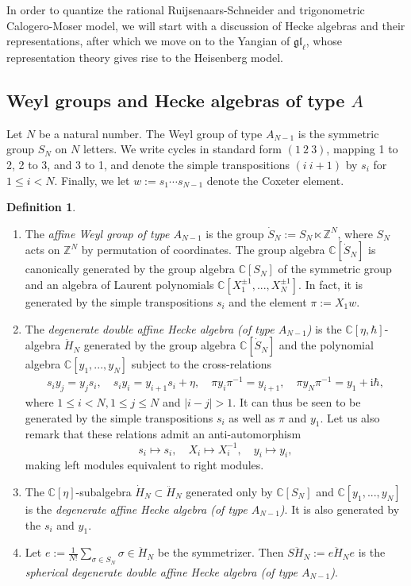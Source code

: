 \documentclass[11pt]{report}
\theoremstyle{definition}
\newtheorem{definition}[theorem]{Definition}
\theoremstyle{remark}
\theoremstyle{remark}
\newcommand{\Z}{\mathbb{Z}}
\newcommand{\C}{\mathbb{C}}
\newcommand{\I}{\mathrm{i}}
\begin{document}
In order to quantize the rational Ruijsenaars-Schneider and trigonometric Calogero-Moser model, we will start with a discussion of Hecke algebras and their representations, after which we move on to the Yangian of $\mathfrak{gl}_\ell$, whose representation theory gives rise to the Heisenberg model.

\subsection{Weyl groups and Hecke algebras of type $A$}

Let $N$ be a natural number. The Weyl group of type $A_{N-1}$ is the symmetric group $S_N$ on $N$ letters. We write cycles in standard form $(1 \ 2 \ 3)$, mapping 1 to 2, 2 to 3, and 3 to 1, and denote the simple transpositions $(i \ i+1)$ by $s_i$ for $1 \leq i < N$. Finally, we let $w := s_1 \cdots s_{N-1}$ denote the Coxeter element.

\begin{definition}
\begin{enumerate}[label=(\roman*)]
\item The \emph{affine Weyl group of type $A_{N-1}$} is the group $\dot S_N := S_N \ltimes \Z^N$, where $S_N$ acts on $\Z^N$ by permutation of coordinates. The group algebra $\C[\dot S_N]$ is canonically generated by the group algebra $\C[S_N]$ of the symmetric group and an algebra of Laurent polynomials $\C[X_1^{\pm 1},...,X_N^{\pm 1}]$. In fact, it is generated by the simple transpositions $s_i$ and the element $\pi := X_1 w$.
\item The \emph{degenerate double affine Hecke algebra (of type $A_{N-1}$)} is the $\C[\eta,\hbar]$-algebra $\ddot H_N$ generated by the group algebra $\C[\dot S_N]$ and the polynomial algebra $\C[y_1,...,y_N]$ subject to the cross-relations
\begin{align*}
s_i y_j = y_j s_i, \quad s_i y_i = y_{i+1} s_i + \eta, \quad \pi y_i \pi^{-1} = y_{i+1}, \quad \pi y_N \pi^{-1} = y_1 + \I \hbar,
\end{align*}
where $1 \leq i < N, 1 \leq j \leq N$ and $|i-j|>1$. It can thus be seen to be generated by the simple transpositions $s_i$ as well as $\pi$ and $y_1$. Let us also remark that these relations admit an anti-automorphism
\begin{equation*}
s_i \mapsto s_i, \quad X_i \mapsto X_i^{-1}, \quad y_i \mapsto y_i,
\end{equation*}
making left modules equivalent to right modules.
\item The $\C[\eta]$-subalgebra $\dot H_N \subset \ddot H_N$ generated only by $\C[S_N]$ and $\C[y_1,...,y_N]$ is the \emph{degenerate affine Hecke algebra (of type $A_{N-1}$)}. It is also generated by the $s_i$ and $y_1$.
\item Let $e := \frac{1}{N!}\sum_{\sigma \in S_N} \sigma \in \ddot H_N$ be the symmetrizer. Then $S\ddot H_N := e \ddot H_N e$ is the \emph{spherical degenerate double affine Hecke algebra (of type $A_{N-1}$)}.
\end{enumerate}
\end{definition}
\end{document}

